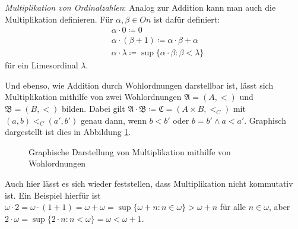 \documentclass[german]{article}
\theoremstyle{break}
\theoremstyle{def_style}
\theoremstyle{def_style}
\theoremstyle{lemma_style}
\begin{document}
\textit{Multiplikation von Ordinalzahlen}: Analog zur Addition kann man auch die Multiplikation definieren. Für $\alpha,\beta\in On$ ist dafür definiert:
\begin{align*}
	&\alpha\cdot0\coloneqq 0\\
	&\alpha\cdot(\beta+1)\coloneqq\alpha\cdot\beta+\alpha\\
	&\alpha\cdot\lambda\coloneqq\sup\{\alpha\cdot\beta : \beta<\lambda\}
\end{align*}
für ein Limesordinal $\lambda$.

Und ebenso, wie Addition durch Wohlordnungen darstellbar ist, lässt sich Multiplikation mithilfe von zwei Wohlordnungen $\mathfrak{A}=(A,<)$ und $\mathfrak{B}=(B,<)$ bilden. Dabei gilt $\mathfrak{A}\cdot\mathfrak{B}\coloneqq\mathfrak{C}=(A\times B, <_C)$ mit $(a,b)<_C(a',b')$ genau dann, wenn $b<b'$ oder $b=b'\land a<a'$. Graphisch dargestellt ist dies in Abbildung \ref{MultiplikationWO}.
	
\begin{figure}[h]
	\begin{center}
	\end{center}
	\caption{Graphische Darstellung von Multiplikation mithilfe von Wohlordnungen}
	\label{MultiplikationWO}
\end{figure}

Auch hier lässt es sich wieder feststellen, dass Multiplikation nicht kommutativ ist. Ein Beispiel hierfür ist $\omega\cdot 2=\omega\cdot(1+1)=\omega+\omega=\sup\{\omega+n : n\in\omega\}>\omega+n$ für alle $n\in\omega$, aber $2\cdot\omega=\sup\{2\cdot n : n<\omega\}=\omega<\omega+1$.
\end{document}

